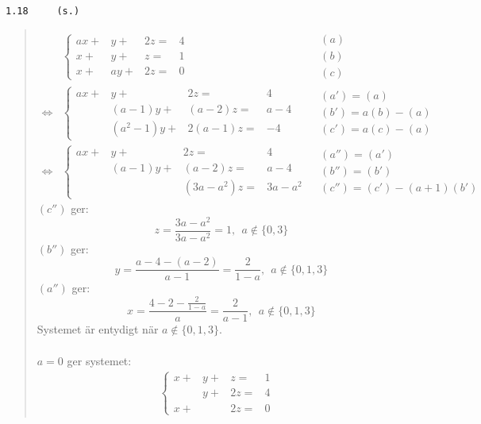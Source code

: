 \documentclass[a4paper]{article}
\newcommand{\tskcol}[1]{\textcolor{tskcol}{#1}}
\begin{document}
\pagebreak
\texttt{\tskcol{1.18~~~~ (s.)}}
\begin{quotation}
	\noindent
	\begin{align*}
	&\left\{\begin{array}{rrrr}
	ax+& y+&2z=&4 \\
	 x+& y+& z=&1 \\
	 x+&ay+&2z=&0
	\end{array} \right.
	&\begin{array}{l} 
	(a) \\ 
	(b) \\
	(c)
	\end{array} \\ \Leftrightarrow
	&\left\{\begin{array}{rrrr}
	ax+&       y+&     2z=&4 \\
	   &  (a-1)y+& (a-2)z=&a-4 \\
	   &(a^2-1)y+&2(a-1)z=&-4
	\end{array} \right.
	&\begin{array}{l} 
	(a')=(a) \\ 
	(b')=a(b)-(a) \\
	(c')=a(c)-(a)
	\end{array} \\ \Leftrightarrow
	&\left\{\begin{array}{rrrr}
	ax+&     y+&       2z=&4 \\
	   &(a-1)y+&   (a-2)z=&a-4 \\
	   &       &(3a-a^2)z=&3a-a^2
	\end{array} \right.
	&\begin{array}{l} 
	(a'')=(a') \\ 
	(b'')=(b') \\
	(c'')=(c')-(a+1)(b')
	\end{array} 
	\end{align*}
	$(c'')$ ger:
	\[z=\frac{3a-a^2}{3a-a^2}=1,~~a\not\in\{0,3\}\]
	$(b'')$ ger:
	\[y=\frac{a-4-(a-2)}{a-1}=\frac{2}{1-a},~~a\not\in\{0,1,3\}\]
	$(a'')$ ger:
	\[x=\frac{4-2-\frac{2}{1-a}}{a}=\frac{2}{a-1},~~a\not\in\{0,1,3\}\]
	Systemet är entydigt när $a\not\in\{0,1,3\}$.
	\\ \\
	$a=0$ ger systemet:
	\begin{align*}
	&\left\{\begin{array}{rrrr}
	x+& y+& z=&1 \\
	  & y+&2z=&4 \\
	x+&   &2z=&0
	\end{array} \right.
	&\begin{array}{l} 

\end{array}
\end{align*}
\end{quotation}
\end{document}
